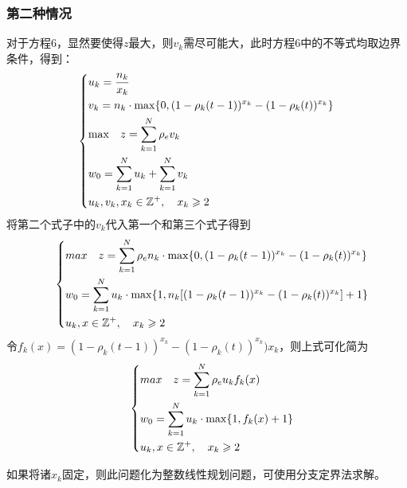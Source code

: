 \documentclass[withoutpreface,bwprint]{cumcmthesis} %
\begin{document}
\subsubsection{第二种情况}
对于方程6，显然要使得$z$最大，则$v_k$需尽可能大，此时方程6中的不等式均取边界条件，得到：
\begin{align}
\label{eq2solution1}
    \left\{
    \begin{aligned}
        &u_k =\dfrac{n_k}{x_k} \\
        &v_k =n_k \cdot {\rm max}
         \{0,(1-\rho_k(t-1))^{x_k}-(1-\rho_k(t))^{x_k} \} \\
        &{\rm max} \quad z = \sum^N_{k=1}\rho_e v_k  \\
        &w_0 =\sum^N_{k=1} u_k +\sum^N_{k=1} v_k  \\
        &u_k,v_k,x_k\in\mathbb{Z^+},\quad  x_k \geqslant 2  \\
    \end{aligned}
    \right.
\end{align}
将第二个式子中的$v_k$代入第一个和第三个式子得到
\begin{align}
\label{eq2solution1}
\quad\left\{
    \begin{aligned}
        &max\quad z = \sum^N_{k=1}\rho_e n_k \cdot {\rm max}
         \{0,(1-\rho_k(t-1))^{x_k} - (1-\rho_k(t))^{x_k} \}   \\
        &w_0 = \sum^N_{k=1} u_k\cdot {\rm max} \{1, n_k  [(1-\rho_k(t-1))^{x_k}-(1-\rho_k(t))^{x_k}] +1 \} \\
        &u_k,x\in\mathbb{Z^+}, \quad x_k \geqslant 2 \\
    \end{aligned}
    \right.
\end{align}
令$f_k(x) = (1-\rho_k(t-1))^{x_k}-(1-\rho_k(t))^{x_k})x_k$，则上式可化简为
\begin{align}
\label{eq2solution1}
\quad\left\{
    \begin{aligned}
        &max\quad z = \sum^N_{k=1}\rho_e u_k f_k(x)  \\
        &w_0 = \sum^N_{k=1} u_k \cdot {\rm max}\{1,f_k(x)+1\}  \\
        &u_k,x\in\mathbb{Z^+},  \quad x_k \geqslant 2 \\
    \end{aligned}
    \right.
\end{align}

如果将诸$x_k$固定，则此问题化为整数线性规划问题，可使用分支定界法求解。
\end{document}
